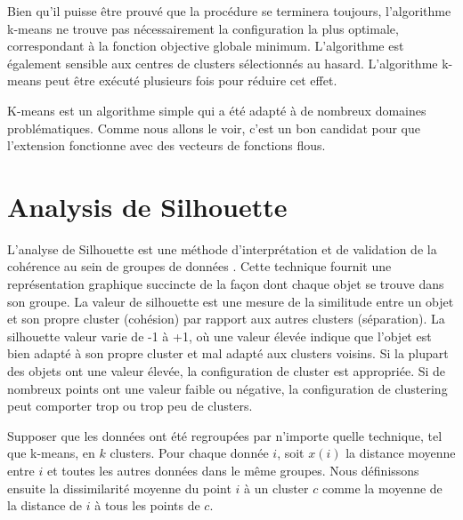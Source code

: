Bien qu'il puisse être prouvé que la procédure se terminera toujours, l'algorithme k-means ne trouve pas nécessairement la configuration la plus optimale, correspondant à la fonction objective globale minimum. L'algorithme est également sensible aux centres de clusters sélectionnés au hasard. L'algorithme k-means peut être exécuté plusieurs fois pour réduire cet effet.

K-means est un algorithme simple qui a été adapté à de nombreux domaines problématiques. Comme nous allons le voir, c'est un bon candidat pour que l'extension fonctionne avec des vecteurs de fonctions flous.
\section{ Analysis de Silhouette}
L'analyse de Silhouette est une méthode d'interprétation et de validation de la cohérence au sein de groupes de données \cite{rousseeuw1987}. Cette technique fournit une représentation graphique succincte de la façon dont chaque objet se trouve dans son groupe. La valeur de silhouette est une mesure de la similitude entre un objet et son propre cluster (cohésion) par rapport aux autres clusters (séparation). La silhouette valeur varie de -1 à +1, où une valeur élevée indique que l'objet est bien adapté à son propre cluster et mal adapté aux clusters voisins. Si la plupart des objets ont une valeur élevée, la configuration de cluster est appropriée. Si de nombreux points ont une valeur faible ou négative, la configuration de clustering peut comporter trop ou trop peu de clusters.

Supposer que les données ont été regroupées par n'importe quelle technique, tel que k-means, en $k$ clusters. Pour chaque donnée $i$, soit $x(i)$ la distance moyenne entre $i$ et toutes les autres données dans le même groupes. Nous définissons ensuite la dissimilarité moyenne du point $i$ à un cluster $c$ comme la moyenne de la distance de $i$ à tous les points de $c$.

